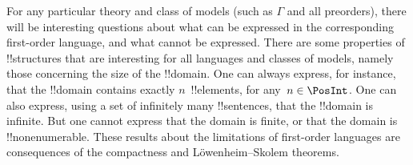 \documentclass[../../../include/open-logic-section]{subfiles}
\begin{document}
For any particular theory and class of models (such as $\Gamma$ and
all preorders), there will be interesting questions about what can be
expressed in the corresponding first-order language, and what cannot
be expressed. There are some properties of !!{structure}s that are
interesting for all languages and classes of models, namely those
concerning the size of the !!{domain}.  One can always express, for
instance, that the !!{domain} contains exactly $n$~!!{element}s, for
any~$n \in \PosInt$.  One can also express, using a set of infinitely
many !!{sentence}s, that the !!{domain} is infinite.  But one cannot
express that the domain is finite, or that the domain is
!!{nonenumerable}. These results about the limitations of first-order
languages are consequences of the compactness and L\"owenheim--Skolem
theorems.
\end{document}
